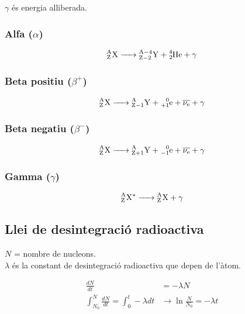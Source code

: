 $\gamma$ és energia alliberada.

\subsubsection{Alfa ($\alpha$)}
\label{ssub:alfa}

\begin{align}
    \ce{
        {^A_ZX} -> {^{A-4}_{Z-2}Y} + ^4_2He + \gamma
    }
\end{align}

\subsubsection{Beta positiu ($\beta ^+$)}
\label{ssub:beta_positiu}

\begin{align}
    \ce{
        {^A_ZX} -> {^{A}_{Z-1}Y} + ^0_{+1}e + \overline{\nu_e} + \gamma
    }
\end{align}

\subsubsection{Beta negatiu ($\beta ^-$)}
\label{ssub:beta_negatiu}

\begin{align}
    \ce{
        {^A_ZX} -> {^{A}_{Z+1}Y} + ^0_{-1}e + \overline{\nu_e} + \gamma
    }
\end{align}

\subsubsection{Gamma ($\gamma$)}
\label{ssub:gamma}

\begin{align}
    \ce{
        {^A_ZX^*} -> {^{A}_{Z}X} + \gamma
    }
\end{align}

\subsection{Llei de desintegració radioactiva}
\label{sub:llei_de_desintegracio_radioactiva}

$N$ = nombre de nucleons. \\ $\lambda$ és la constant de desintegració radioactiva que depen de l'àtom.

\begin{align}
    \frac{dN}{dt} &= - \lambda N \\
    \int_{N_0}^N \frac{dN}{dt}  = \int_0^t -\lambda dt &\rightarrow \ln \frac{N}{N_0} = -\lambda t 
\end{align}

